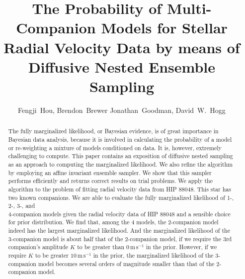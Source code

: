 \documentclass[letterpaper, preprint]{aastex}
\newcounter{address}
\newcommand{\unit}[1]{\mathrm{#1}}
\begin{document}
\title{
  The Probability of Multi-Companion Models for Stellar Radial Velocity Data by means of Diffusive Nested Ensemble Sampling
}

\author{
  Fengji~Hou\altaffilmark{\ref{CCPP},\ref{email}},
  Brendon~Brewer\altaffilmark{\ref{Auckland}}
  Jonathan~Goodman\altaffilmark{\ref{Courant}},
  David~W.~Hogg\altaffilmark{\ref{CCPP},\ref{MPIA}}
}

\setcounter{address}{1}

\begin{abstract}
The fully marginalized likelihood, or Bayesian evidence, is of great importance in Bayesian data analysis, because it is involved in calculating the probability of a model or re-weighting a mixture of models conditioned on data. It is, however, extremely challenging to compute. This paper contains an exposition of diffusive nested sampling as an approach to computing the marginalized likelihood. We also refine the algorithm by employing an affine invariant ensemble sampler. We show that this sampler performs efficiently and returns correct results on trial problems. We apply the algorithm to the problem of fitting radial velocity data from HIP 88048. This star has two known companions. We are able to evaluate the fully marginalized likelihood of 1-, 2-, 3-, and\\ 4-companion models given the radial velocity data of HIP 88048 and a sensible choice for prior distribution. We find that, among the 4 models, the 2-companion model indeed has the largest marginalized likelihood. And the marginalized likelihood of the 3-companion model is about half that of the 2-companion model, if we require the 3rd companion's amplitude $K$ to be greater than $0\,\unit{m\,s^{-1}}$ in the prior. However, if we require $K$ to be greater $10\,\unit{m\,s^{-1}}$ in the prior, the marginalized likelihood of the 3-companion model becomes several orders of magnitude smaller than that of the 2-companion model.

\end{abstract}
\end{document}
